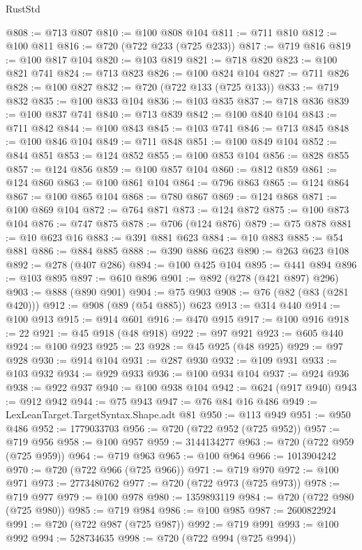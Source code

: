 \begin{lexlean}{RustStd}
\begin{coremodule}
@808 := @713 @807
@810 := @100 @808 @104
@811 := @711 @810
@812 := @100 @811
@816 := @720 (@722 @233 (@725 @233))
@817 := @719 @816
@819 := @100 @817 @104
@820 := @103 @819
@821 := @718 @820
@823 := @100 @821 @741
@824 := @713 @823
@826 := @100 @824 @104
@827 := @711 @826
@828 := @100 @827
@832 := @720 (@722 @133 (@725 @133))
@833 := @719 @832
@835 := @100 @833 @104
@836 := @103 @835
@837 := @718 @836
@839 := @100 @837 @741
@840 := @713 @839
@842 := @100 @840 @104
@843 := @711 @842
@844 := @100 @843
@845 := @103 @741
@846 := @713 @845
@848 := @100 @846 @104
@849 := @711 @848
@851 := @100 @849 @104
@852 := @844 @851
@853 := @124 @852
@855 := @100 @853 @104
@856 := @828 @855
@857 := @124 @856
@859 := @100 @857 @104
@860 := @812 @859
@861 := @124 @860
@863 := @100 @861 @104
@864 := @796 @863
@865 := @124 @864
@867 := @100 @865 @104
@868 := @780 @867
@869 := @124 @868
@871 := @100 @869 @104
@872 := @764 @871
@873 := @124 @872
@875 := @100 @873 @104
@876 := @747 @875
@878 := @706 (@124 @876)
@879 := @75 @878
@881 := @10 @623 @16
@883 := @391 @881 @623
@884 := @10 @883
@885 := @54 @881
@886 := @884 @885
@888 := @390 @886 @623
@890 := @263 @623 @108
@892 := @278 (@407 @286)
@894 := @100 @425 @104
@895 := @441 @894
@896 := @103 @895
@897 := @610 @896
@901 := @892 (@278 (@421 @897) @296)
@903 := @888 (@890 @901)
@904 := @75 @903
@908 := @76 (@82 (@83 (@281 @420)))
@912 := @908 (@89 (@54 @885)) @623
@913 := @314 @440
@914 := @100 @913
@915 := @914 @601
@916 := @470 @915
@917 := @100 @916
@918 := 22
@921 := @45 @918 (@48 @918)
@922 := @97 @921
@923 := @605 @440
@924 := @100 @923
@925 := 23
@928 := @45 @925 (@48 @925)
@929 := @97 @928
@930 := @914 @104
@931 := @287 @930
@932 := @109 @931
@933 := @103 @932
@934 := @929 @933
@936 := @100 @934 @104
@937 := @924 @936
@938 := @922 @937
@940 := @100 @938 @104
@942 := @624 (@917 @940)
@943 := @912 @942
@944 := @75 @943
@947 := @76 @84 @16 @486
@949 := LexLeanTarget.TargetSyntax.Shape.adt @81
@950 := @113 @949
@951 := @950 @486
@952 := 1779033703
@956 := @720 (@722 @952 (@725 @952))
@957 := @719 @956
@958 := @100 @957
@959 := 3144134277
@963 := @720 (@722 @959 (@725 @959))
@964 := @719 @963
@965 := @100 @964
@966 := 1013904242
@970 := @720 (@722 @966 (@725 @966))
@971 := @719 @970
@972 := @100 @971
@973 := 2773480762
@977 := @720 (@722 @973 (@725 @973))
@978 := @719 @977
@979 := @100 @978
@980 := 1359893119
@984 := @720 (@722 @980 (@725 @980))
@985 := @719 @984
@986 := @100 @985
@987 := 2600822924
@991 := @720 (@722 @987 (@725 @987))
@992 := @719 @991
@993 := @100 @992
@994 := 528734635
@998 := @720 (@722 @994 (@725 @994))

\end{coremodule}
\end{lexlean}

